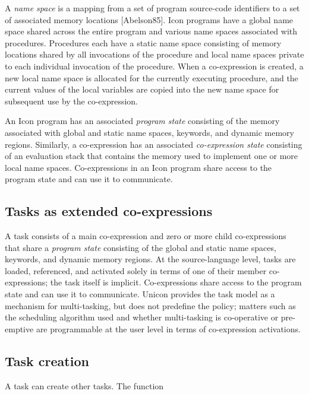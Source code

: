 A \textit{name space} is a mapping from a set of program source-code
identifiers to a set of associated memory locations [Abelson85]. Icon
programs have a global name space shared across the entire program and
various name spaces associated with procedures. Procedures each have a
static name space consisting of memory locations shared by all
invocations of the procedure and local name spaces private to each
individual invocation of the procedure.
When a co-expression is created, a new local name space is allocated for
the currently executing procedure, and the current values of the local
variables are copied into the new name space for subsequent use by the
co-expression.

An Icon program has an associated \textit{program state} consisting of
the memory associated with global and static name spaces, keywords, and
dynamic memory regions. Similarly, a co-expression has an associated
\textit{co-expression state} consisting of an evaluation stack that
contains the memory used to implement one or more local name spaces.
Co-expressions in an Icon program share access to the program state and
can use it to communicate.

\subsection*{Tasks as extended co-expressions}

A task consists of a main co-expression and zero or more child
co-expressions that share a {\em program state\/} 
consisting of the global and static name
spaces, keywords, and dynamic memory regions. At the source-language
level, tasks are loaded, referenced, and activated solely in terms of
one of their member co-expressions; the task itself is implicit.
Co-expressions share access to the program state and can use it to
communicate.
Unicon provides the task model as a mechanism for multi-tasking, but does
not predefine the policy; matters such as the scheduling algorithm used and
whether multi-tasking is co-operative or pre-emptive are programmable at the
user level in terms of co-expression activations.


\subsection*{Task creation}

A task can create other tasks. The function



